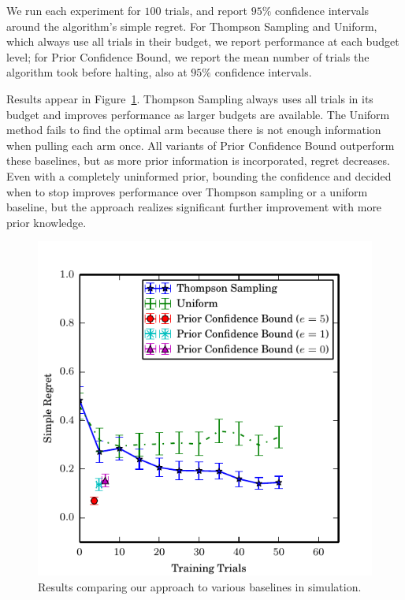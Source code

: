 \documentclass{article}
\newcommand{\algorithmDTxt}{Prior Confidence Bound\xspace}
\begin{document}
We run each experiment for $100$ trials, and report $95\%$ confidence
intervals around the algorithm's simple regret.  For Thompson Sampling
and Uniform, which always use all trials in their budget, we report
performance at each budget level; for \algorithmDTxt, we report the
mean number of trials the algorithm took before halting, also at
$95\%$ confidence intervals.

Results appear in Figure~\ref{fig:simulation_results}.  Thompson
Sampling always uses all trials in its budget and improves performance
as larger budgets are available.  The Uniform method fails to find the
optimal arm because there is not enough information when pulling each
arm once.  All variants of \algorithmDTxt outperform these baselines,
but as more prior information is incorporated, regret decreases.  Even
with a completely uninformed prior, bounding the confidence and
decided when to stop improves performance over Thompson sampling or a
uniform baseline, but the approach realizes significant further
improvement with more prior knowledge.


\begin{figure}
\includegraphics{figures/bestarm.pdf}
\caption{Results comparing our approach to various baselines in simulation.\label{fig:simulation_results}}
\end{figure}
\end{document}
